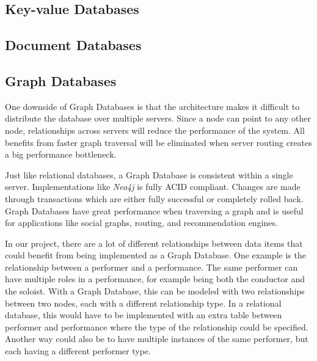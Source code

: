 \subsection{Key-value Databases}
\label{analysis-kv-db}

\subsection{Document Databases}
\label{analysis-doc-db}

\subsection{Graph Databases}
\label{analysis-graph-db}

One downside of Graph Databases is that the architecture makes it difficult to distribute the database over multiple servers. Since a node can point to any other node, relationships across servers will reduce the performance of the system. All benefits from faster graph traversal will be eliminated when server routing creates a big performance bottleneck.

Just like relational databases, a Graph Database is consistent within a single server. Implementations like \emph{Neo4j} is fully ACID compliant. Changes are made through transactions which are either fully successful or completely rolled back. Graph Databases have great performance when traversing a graph and is useful for applications like social graphs, routing, and recommendation engines.

In our project, there are a lot of different relationships between data items that could benefit from being implemented as a Graph Database. One example is the relationship between a performer and a performance. The same performer can have multiple roles in a performance, for example being both the conductor and the soloist. With a Graph Database, this can be modeled with two relationships between two nodes, each with a different relationship type. In a relational database, this would have to be implemented with an extra table between performer and performance where the type of the relationship could be specified. Another way could also be to have multiple instances of the same performer, but each having a different performer type.

